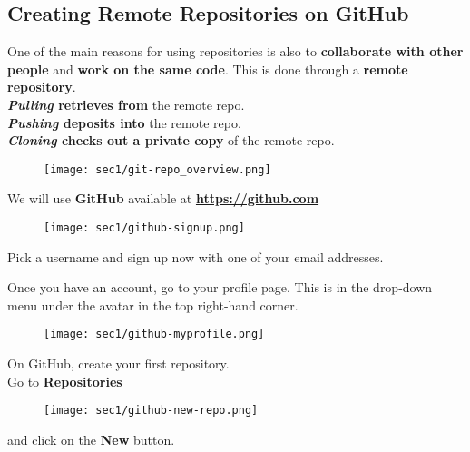 \subsection{Creating Remote Repositories on GitHub}\hypertarget{sec1.6}{}

\begin{frame}[fragile]
\emptyframetitle
  One of the main reasons for using repositories is also to \textbf{collaborate with other people} and \textbf{work on the same code}. This is done through a \textbf{remote repository}. \\[0.25cm]

  \textbf{\textit{Pulling} retrieves from} the remote repo.\\
  \textbf{\textit{Pushing} deposits into} the remote repo.\\
  \textbf{\textit{Cloning} checks out a private copy} of the remote repo.
  \begin{figure}[h]
    \texttt{[image: sec1/git-repo\_overview.png]}
  \end{figure}

\end{frame}

\begin{frame}[fragile]
\emptyframetitle
  We will use \textbf{GitHub} available at \textbf{\url{https://github.com}}

  \begin{figure}[h]
    \texttt{[image: sec1/github-signup.png]}
  \end{figure}

  Pick a username and sign up now with one of your email addresses.

\end{frame}

\begin{frame}[fragile]
\emptyframetitle

  Once you have an account, go to your profile page. This is in the drop-down menu under the avatar in the top right-hand corner.
  \begin{figure}[h]
    \texttt{[image: sec1/github-myprofile.png]}
  \end{figure}

\end{frame}

\begin{frame}[fragile]
\emptyframetitle

  On GitHub, create your first repository.\\[0.25cm]
  Go to \textbf{Repositories}
  \begin{figure}[h]
    \texttt{[image: sec1/github-new-repo.png]}
  \end{figure}
  and click on the \textbf{New} button.

\end{frame}


